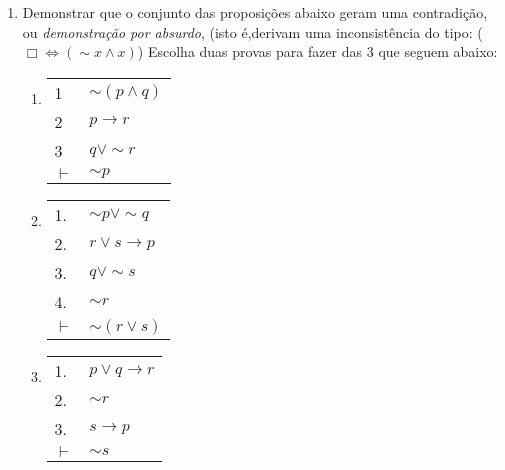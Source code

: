 \documentclass[12pt, a4paper,final]{article}
\begin{document}
\begin{enumerate}
\item Demonstrar que o conjunto das proposi\c c\~oes abaixo geram uma contradi\c c\~ao, ou
 {\em demonstra\c c\~ao por absurdo},  (isto \'e,derivam uma inconsist\^encia do tipo: ($\Box \Leftrightarrow (\sim x \wedge x)$)
Escolha duas provas para fazer das 3 que seguem  abaixo:

\begin{enumerate}
\setlength{\itemsep}{-4pt}
\item 
\vskip 11pt
\begin{tabular}{ll}  
  1 &  $\sim (p \wedge q) $ \\  
  2 &  $ p \rightarrow r$ \\ 
  3 &  $q \vee \sim r$ \\ \hline
  $\vdash $  & $\sim p$   
\end{tabular}

\item 
\vskip 11pt
\begin{tabular}{ll}  %
   1. &  $  \sim p \vee \sim q $ \\   
    2. &   $ r \vee s \rightarrow p$  \\
    3. & $ q \vee \sim s $ \\    
    4. & $ \sim r $ \\ \hline
    $\vdash $  & $ \sim (r \vee s)$ 
\end{tabular}

\item 
\vskip 11pt
\begin{tabular}{ll}  %
 1. &  $p \vee q \rightarrow r$ \\   
  2. &  $ \sim r $ \\    
  3. &  $s \rightarrow p $ \\   \hline
     $\vdash $ & $ \sim s $   
     \end{tabular}
\end{enumerate}

\end{enumerate}
\end{document}

